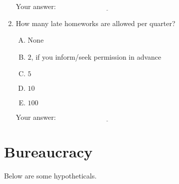 \documentclass[10pt]{amsart}
\begin{document}
\begin{enumerate}
  \vspace{0.1in}
  Your answer: $\underline{\qquad\qquad\qquad\qquad\qquad\qquad\qquad}$
  \vspace{0.1in}

\item How many late homeworks are allowed per quarter?

  \begin{enumerate}[(A)]
  \item None
  \item $2$, if you inform/seek permission in advance
  \item $5$
  \item $10$
  \item $100$ 
  \end{enumerate}

  \vspace{0.1in}
  Your answer: $\underline{\qquad\qquad\qquad\qquad\qquad\qquad\qquad}$
  \vspace{0.1in}
\end{enumerate}

\section{Bureaucracy}

Below are some hypotheticals.
\end{document}
